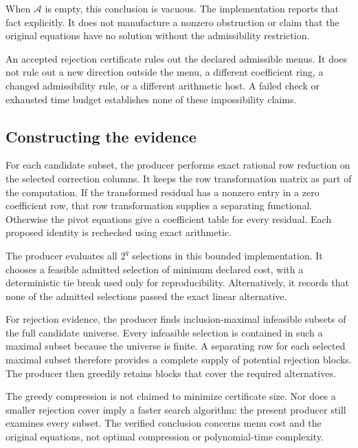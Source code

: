When $\mathcal A$ is empty, this conclusion is vacuous. The implementation reports that fact explicitly. It does not manufacture a nonzero obstruction or claim that the original equations have no solution without the admissibility restriction.

\begin{scopebox}[title=The scope of rejection]
An accepted rejection certificate rules out the declared admissible menus. It does not rule out a new direction outside the menu, a different coefficient ring, a changed admissibility rule, or a different arithmetic host. A failed check or exhausted time budget establishes none of these impossibility claims.
\end{scopebox}

\subsection{Constructing the evidence}

For each candidate subset, the producer performs exact rational row reduction on the selected correction columns. It keeps the row transformation matrix as part of the computation. If the transformed residual has a nonzero entry in a zero coefficient row, that row transformation supplies a separating functional. Otherwise the pivot equations give a coefficient table for every residual. Each proposed identity is rechecked using exact arithmetic.

The producer evaluates all $2^q$ selections in this bounded implementation. It chooses a feasible admitted selection of minimum declared cost, with a deterministic tie break used only for reproducibility. Alternatively, it records that none of the admitted selections passed the exact linear alternative.

For rejection evidence, the producer finds inclusion-maximal infeasible subsets of the full candidate universe. Every infeasible selection is contained in such a maximal subset because the universe is finite. A separating row for each selected maximal subset therefore provides a complete supply of potential rejection blocks. The producer then greedily retains blocks that cover the required alternatives.

The greedy compression is not claimed to minimize certificate size. Nor does a smaller rejection cover imply a faster search algorithm: the present producer still examines every subset. The verified conclusion concerns menu cost and the original equations, not optimal compression or polynomial-time complexity.

